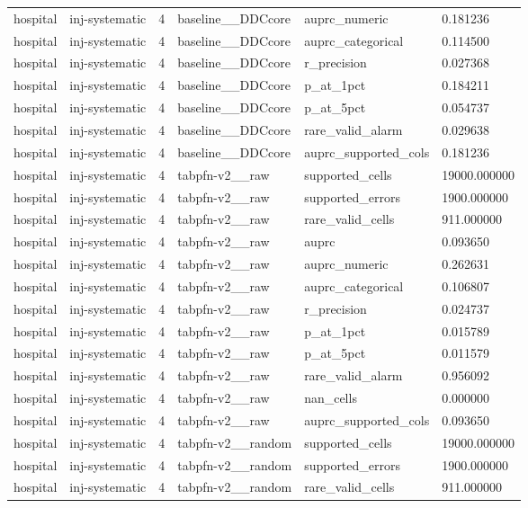 \begin{tabular}{llllll}
hospital & inj-systematic & 4 & baseline\_\_DDCcore & auprc\_numeric & 0.181236 \\
hospital & inj-systematic & 4 & baseline\_\_DDCcore & auprc\_categorical & 0.114500 \\
hospital & inj-systematic & 4 & baseline\_\_DDCcore & r\_precision & 0.027368 \\
hospital & inj-systematic & 4 & baseline\_\_DDCcore & p\_at\_1pct & 0.184211 \\
hospital & inj-systematic & 4 & baseline\_\_DDCcore & p\_at\_5pct & 0.054737 \\
hospital & inj-systematic & 4 & baseline\_\_DDCcore & rare\_valid\_alarm & 0.029638 \\
hospital & inj-systematic & 4 & baseline\_\_DDCcore & auprc\_supported\_cols & 0.181236 \\
hospital & inj-systematic & 4 & tabpfn-v2\_\_raw & supported\_cells & 19000.000000 \\
hospital & inj-systematic & 4 & tabpfn-v2\_\_raw & supported\_errors & 1900.000000 \\
hospital & inj-systematic & 4 & tabpfn-v2\_\_raw & rare\_valid\_cells & 911.000000 \\
hospital & inj-systematic & 4 & tabpfn-v2\_\_raw & auprc & 0.093650 \\
hospital & inj-systematic & 4 & tabpfn-v2\_\_raw & auprc\_numeric & 0.262631 \\
hospital & inj-systematic & 4 & tabpfn-v2\_\_raw & auprc\_categorical & 0.106807 \\
hospital & inj-systematic & 4 & tabpfn-v2\_\_raw & r\_precision & 0.024737 \\
hospital & inj-systematic & 4 & tabpfn-v2\_\_raw & p\_at\_1pct & 0.015789 \\
hospital & inj-systematic & 4 & tabpfn-v2\_\_raw & p\_at\_5pct & 0.011579 \\
hospital & inj-systematic & 4 & tabpfn-v2\_\_raw & rare\_valid\_alarm & 0.956092 \\
hospital & inj-systematic & 4 & tabpfn-v2\_\_raw & nan\_cells & 0.000000 \\
hospital & inj-systematic & 4 & tabpfn-v2\_\_raw & auprc\_supported\_cols & 0.093650 \\
hospital & inj-systematic & 4 & tabpfn-v2\_\_random & supported\_cells & 19000.000000 \\
hospital & inj-systematic & 4 & tabpfn-v2\_\_random & supported\_errors & 1900.000000 \\
hospital & inj-systematic & 4 & tabpfn-v2\_\_random & rare\_valid\_cells & 911.000000 \\

\end{tabular}
